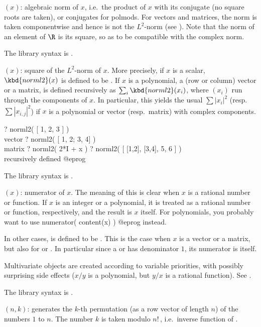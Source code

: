 $(x)$: \label{se:norm}
algebraic norm of $x$, i.e.~the product of $x$ with
its conjugate (no square roots are taken), or conjugates for polmods. For
vectors and matrices, the norm is taken componentwise and hence is not the
$L^2$-norm (see ). Note that the norm of an element of
$\R$ is its square, so as to be compatible with the complex norm.

The library syntax is .

$(x)$: \label{se:norml2}
square of the $L^2$-norm of $x$. More precisely,
if $x$ is a scalar, $\kbd{norml2}(x)$ is defined to be .
If $x$ is a polynomial, a (row or column) vector or a matrix,  is
defined recursively as $\sum_i \kbd{norml2}(x_i)$, where $(x_i)$ run through
the components of $x$. In particular, this yields the usual $\sum |x_i|^2$
(resp.~$\sum |x_{i,j}|^2$) if $x$ is a polynomial or vector (resp.~matrix) with
complex components.

\bprog
? norml2( [ 1, 2, 3 ] )      \\ vector
? norml2( [ 1, 2; 3, 4] )   \\ matrix
? norml2( 2*I + x )
? norml2( [ [1,2], [3,4], 5, 6 ] )   \\ recursively defined
@eprog

The library syntax is .

$(x)$: \label{se:numerator}
numerator of $x$. The meaning of this
is clear when $x$ is a rational number or function. If $x$ is an integer
or a polynomial, it is treated as a rational number or function,
respectively, and the result is $x$ itself. For polynomials, you
probably want to use
\bprog
numerator( content(x) )
@eprog\noindent
instead.

In other cases,  is defined to be
. This is the case when $x$ is a vector or a
matrix, but also for  or . In particular since a
 or  has  denominator $1$, its numerator is
itself.

 Multivariate objects are created according to variable
priorities, with possibly surprising side effects ($x/y$ is a polynomial, but
$y/x$ is a rational function). See .

The library syntax is .

$(n,k)$: \label{se:numtoperm}generates the $k$-th permutation (as a row vector of length $n$) of the
numbers $1$ to $n$. The number $k$ is taken modulo $n!\,$, i.e.~inverse
function of .

